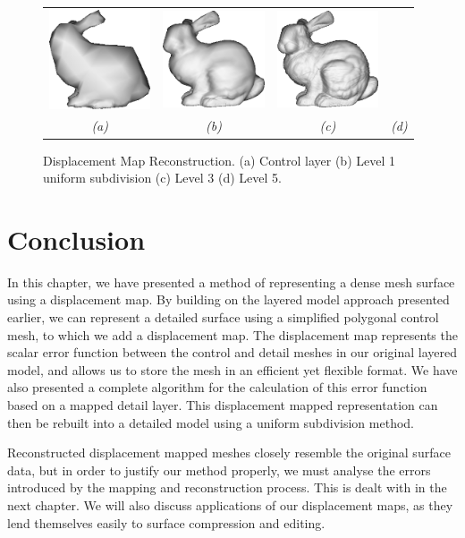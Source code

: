 \begin{figure}
\begin{center}
\begin{tabular}{cccc}
\includegraphics[width=3cm]{../images/bunny_level1} &
\includegraphics[width=3cm]{../images/bunny_level3} &
\includegraphics[width=3cm]{../images/bunny_level5} \\
{\it (a)} & {\it (b)} & {\it (c)} & {\it (d)}
\end{tabular}
\caption[Displacement Map Reconstruction]{\label{fig:regen} Displacement Map Reconstruction. (a) Control layer (b) Level 1 uniform subdivision (c) Level 3 (d) Level 5. }
\end{center}
\end{figure}

\section{\label{sec:dispmapcreation:conclusion}Conclusion}

In this chapter, we have presented a method of representing a dense mesh surface using a displacement map. By building on the layered model approach presented earlier, we can represent a detailed surface using a simplified polygonal control mesh, to which we add a displacement map. The displacement map represents the scalar error function between the control and detail meshes in our original layered model, and allows us to store the mesh in an efficient yet flexible format. We have also presented a complete algorithm for the calculation of this error function based on a mapped detail layer.  This displacement mapped representation can then be rebuilt into a detailed model using a uniform subdivision method. 

Reconstructed displacement mapped meshes closely resemble the original surface data, but in order to justify our method properly, we must analyse the errors introduced by the mapping and reconstruction process. This is dealt with in the next chapter. We will also discuss applications of our displacement maps, as they lend themselves easily to surface compression and editing.
